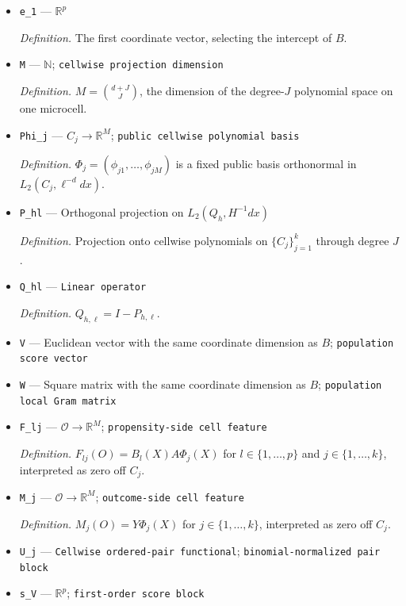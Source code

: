 \documentclass{article}
\begin{document}
\begin{itemize}
  \item \texttt{e\_\allowbreak{}1} --- \(\mathbb R^p\)
  \par\smallskip\noindent\emph{Definition.} The first coordinate vector, selecting the intercept of \(B\).
  \item \texttt{M} --- \(\mathbb N\); \texttt{cellwise projection dimension}
  \par\smallskip\noindent\emph{Definition.} \(M=\binom{d+J}{J}\), the dimension of the degree-\(J\) polynomial space on one microcell.
  \item \texttt{Phi\_\allowbreak{}j} --- \(C_j\to\mathbb R^M\); \texttt{public cellwise polynomial basis}
  \par\smallskip\noindent\emph{Definition.} \(\Phi_j=(\phi_{j1},\ldots,\phi_{jM})\) is a fixed public basis orthonormal in \(L_2(C_j,\ell^{-d}dx)\).
  \item \texttt{P\_\allowbreak{}hl} --- Orthogonal projection on \(L_2(Q_h,H^{-1}dx)\)
  \par\smallskip\noindent\emph{Definition.} Projection onto cellwise polynomials on \(\{C_j\}_{j=1}^k\) through degree \(J\).
  \item \texttt{Q\_\allowbreak{}hl} --- \texttt{Linear operator}
  \par\smallskip\noindent\emph{Definition.} \(Q_{h,\ell}=I-P_{h,\ell}\).
  \item \texttt{V} --- Euclidean vector with the same coordinate dimension as \(B\); \texttt{population score vector}
  \item \texttt{W} --- Square matrix with the same coordinate dimension as \(B\); \texttt{population local Gram matrix}
  \item \texttt{F\_\allowbreak{}lj} --- \(\mathcal O\to\mathbb R^M\); \texttt{propensity-\allowbreak{}side cell feature}
  \par\smallskip\noindent\emph{Definition.} \(F_{lj}(O)=B_l(X)A\Phi_j(X)\) for \(l\in\{1,\ldots,p\}\) and \(j\in\{1,\ldots,k\}\), interpreted as zero off \(C_j\).
  \item \texttt{M\_\allowbreak{}j} --- \(\mathcal O\to\mathbb R^M\); \texttt{outcome-\allowbreak{}side cell feature}
  \par\smallskip\noindent\emph{Definition.} \(M_j(O)=Y\Phi_j(X)\) for \(j\in\{1,\ldots,k\}\), interpreted as zero off \(C_j\).
  \item \texttt{U\_\allowbreak{}j} --- \texttt{Cellwise ordered-\allowbreak{}pair functional}; \texttt{binomial-\allowbreak{}normalized pair block}
  \item \texttt{s\_\allowbreak{}V} --- \(\mathbb R^p\); \texttt{first-\allowbreak{}order score block}

\end{itemize}
\end{document}

